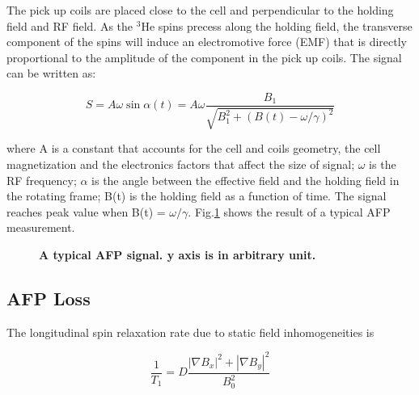 The pick up coils are placed close to the cell and perpendicular to the holding field and RF field. As the $^{3}$He spins precess along the holding field, the transverse component of the spins will induce an electromotive force (EMF) that is directly proportional to the amplitude of the component in the pick up coils. The signal can be written as:

\begin{equation}
S=A\omega \sin{\alpha(t)}=A\omega \frac{B_{1}}{\sqrt{B_{1}^{2}+(B(t)-\omega/\gamma)^{2}}}
\end{equation}

where A is a constant that accounts for the cell and coils geometry, the cell magnetization and the electronics factors that affect the size of signal; $\omega$ is the RF frequency; $\alpha$ is the angle between the effective field and the holding field in the rotating frame; B(t) is the holding field as a function of time. The signal reaches peak value when B(t) = $\omega/\gamma$. Fig.\ref{AFPSignal} shows the result of a typical AFP measurement.

\begin{figure}[H]\label{AFPSignal}
	\centering
	\caption{{\bf A typical AFP signal. y axis is in arbitrary unit.}}
	\label{AFPSignal}
\end{figure}

\subsection{AFP Loss}

The longitudinal spin relaxation rate due to static field inhomogeneities is

\begin{equation}
\frac{1}{T_{1}} = D\frac{|\nabla B_{x}|^{2}+|\nabla B_{y}|^{2}}{B_{0}^{2}}
\end{equation}

